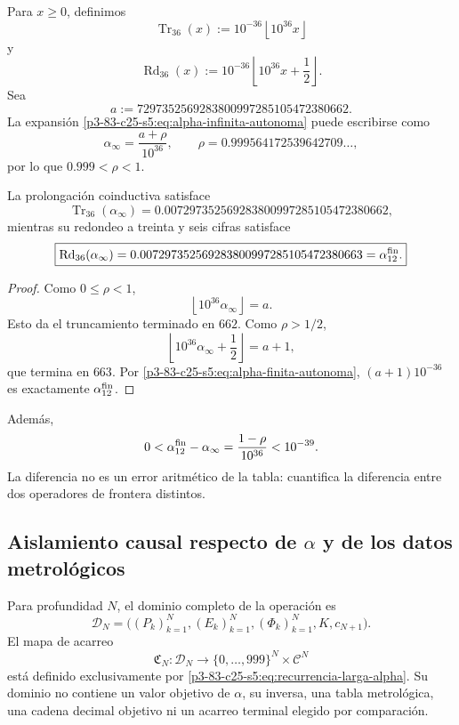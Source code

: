 Para \(x\geq0\), definimos
\[
 \operatorname{Tr}_{36}(x)
 :=10^{-36}\left\lfloor10^{36}x\right\rfloor
\]
y
\[
 \operatorname{Rd}_{36}(x)
 :=10^{-36}\left\lfloor10^{36}x+\frac12\right\rfloor.
\]
Sea
\[
 a:=7297352569283800997285105472380662.
\]
La expansión \eqref{p3-83-c25-s5:eq:alpha-infinita-autonoma} puede escribirse como
\[
 \alpha_\infty=\frac{a+\rho}{10^{36}},
 \qquad
 \rho=0.999564172539642709\ldots,
\]
por lo que \(0.999<\rho<1\).

\begin{theorem}
\label{p3-83-c25-s5:thm:frontera-alpha-662-663}
La prolongación coinductiva satisface
\[
 \boxed{
 \operatorname{Tr}_{36}(\alpha_\infty)
 =0.007297352569283800997285105472380662,}
\]
mientras su redondeo a treinta y seis cifras satisface
\[
 \boxed{
 \operatorname{Rd}_{36}(\alpha_\infty)
 =0.007297352569283800997285105472380663
 =\alpha_{12}^{\rm fin}.}
\]
\end{theorem}

\begin{proof}
Como \(0\leq\rho<1\),
\[
 \left\lfloor10^{36}\alpha_\infty\right\rfloor=a.
\]
Esto da el truncamiento terminado en \(662\). Como \(\rho>1/2\),
\[
 \left\lfloor10^{36}\alpha_\infty+\frac12\right\rfloor=a+1,
\]
que termina en \(663\). Por \eqref{p3-83-c25-s5:eq:alpha-finita-autonoma},
\((a+1)10^{-36}\) es exactamente \(\alpha_{12}^{\rm fin}\).
\end{proof}

Además,
\[
 0<\alpha_{12}^{\rm fin}-\alpha_\infty
 =\frac{1-\rho}{10^{36}}<10^{-39}.
\]
La diferencia no es un error aritmético de la tabla: cuantifica la
diferencia entre dos operadores de frontera distintos.

\subsection{Aislamiento causal respecto de \texorpdfstring{\(\alpha\)}{alpha} y de los datos metrológicos}

Para profundidad \(N\), el dominio completo de la operación es
\[
 \mathscr D_N
 =\bigl((P_k)_{k=1}^{N},(E_k)_{k=1}^{N},
        (\Phi_k)_{k=1}^{N},K,c_{N+1}\bigr).
\]
El mapa de acarreo
\[
 \mathfrak C_N:\mathscr D_N
 \longrightarrow
 \{0,\ldots,999\}^{N}\times\mathcal C^{N}
\]
está definido exclusivamente por \eqref{p3-83-c25-s5:eq:recurrencia-larga-alpha}. Su
dominio no contiene un valor objetivo de \(\alpha\), su inversa, una tabla
metrológica, una cadena decimal objetivo ni un acarreo terminal elegido por
comparación.

